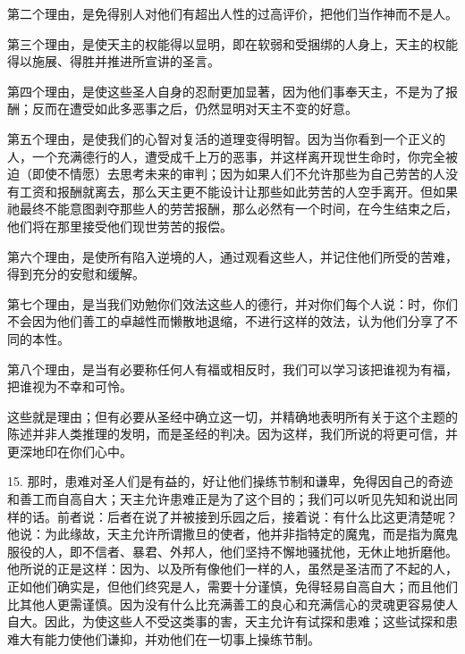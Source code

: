 第二个理由，是免得别人对他们有超出人性的过高评价，把他们当作神而不是人。\par

第三个理由，是使天主的权能得以显明，即在软弱和受捆绑的人身上，天主的权能得以施展、得胜并推进所宣讲的圣言。\par

第四个理由，是使这些圣人自身的忍耐更加显著，因为他们事奉天主，不是为了报酬；反而在遭受如此多恶事之后，仍然显明对天主不变的好意。\par

第五个理由，是使我们的心智对复活的道理变得明智。因为当你看到一个正义的人，一个充满德行的人，遭受成千上万的恶事，并这样离开现世生命时，你完全被迫（即使不情愿）去思考未来的审判；因为如果人们不允许那些为自己劳苦的人没有工资和报酬就离去，那么天主更不能设计让那些如此劳苦的人空手离开。但如果祂最终不能意图剥夺那些人的劳苦报酬，那么必然有一个时间，在今生结束之后，他们将在那里接受他们现世劳苦的报偿。\par

第六个理由，是使所有陷入逆境的人，通过观看这些人，并记住他们所受的苦难，得到充分的安慰和缓解。\par

第七个理由，是当我们劝勉你们效法这些人的德行，并对你们每个人说：时，你们不会因为他们善工的卓越性而懒散地退缩，不进行这样的效法，认为他们分享了不同的本性。\par

第八个理由，是当有必要称任何人有福或相反时，我们可以学习该把谁视为有福，把谁视为不幸和可怜。\par

这些就是理由；但有必要从圣经中确立这一切，并精确地表明所有关于这个主题的陈述并非人类推理的发明，而是圣经的判决。因为这样，我们所说的将更可信，并更深地印在你们心中。\par

15. 那时，患难对圣人们是有益的，好让他们操练节制和谦卑，免得因自己的奇迹和善工而自高自大；天主允许患难正是为了这个目的；我们可以听见先知和说出同样的话。前者说：后者在说了并被接到乐园之后，接着说：有什么比这更清楚呢？他说：为此缘故，天主允许所谓撒旦的使者，他并非指特定的魔鬼，而是指为魔鬼服役的人，即不信者、暴君、外邦人，他们坚持不懈地骚扰他，无休止地折磨他。他所说的正是这样：因为、以及所有像他们一样的人，虽然是圣洁而了不起的人，正如他们确实是，但他们终究是人，需要十分谨慎，免得轻易自高自大；而且他们比其他人更需谨慎。因为没有什么比充满善工的良心和充满信心的灵魂更容易使人自大。因此，为使这些人不受这类事的害，天主允许有试探和患难；这些试探和患难大有能力使他们谦抑，并劝他们在一切事上操练节制。\par

